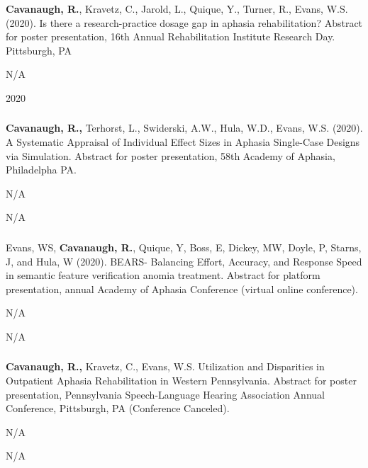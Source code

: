\documentclass[
]{article}
\begin{document}
\textbf{Cavanaugh, R.}, Kravetz, C., Jarold, L., Quique, Y., Turner, R.,
Evans, W.S. (2020). Is there a research-practice dosage gap in aphasia
rehabilitation? Abstract for poster presentation, 16th Annual
Rehabilitation Institute Research Day. Pittsburgh, PA

N/A

2020

\hypertarget{section-17}{%
\subsubsection{}\label{section-17}}

\textbf{Cavanaugh, R.,} Terhorst, L., Swiderski, A.W., Hula, W.D.,
Evans, W.S. (2020). A Systematic Appraisal of Individual Effect Sizes in
Aphasia Single-Case Designs via Simulation. Abstract for poster
presentation, 58th Academy of Aphasia, Philadelpha PA.

N/A

N/A

\hypertarget{section-18}{%
\subsubsection{}\label{section-18}}

Evans, WS, \textbf{Cavanaugh, R.}, Quique, Y, Boss, E, Dickey, MW,
Doyle, P, Starns, J, and Hula, W (2020). BEARS- Balancing Effort,
Accuracy, and Response Speed in semantic feature verification anomia
treatment. Abstract for platform presentation, annual Academy of Aphasia
Conference (virtual online conference).

N/A

N/A

\hypertarget{section-19}{%
\subsubsection{}\label{section-19}}

\textbf{Cavanaugh, R.,} Kravetz, C., Evans, W.S. Utilization and
Disparities in Outpatient Aphasia Rehabilitation in Western
Pennsylvania. Abstract for poster presentation, Pennsylvania
Speech-Language Hearing Association Annual Conference, Pittsburgh, PA
(Conference Canceled).

N/A

N/A

\hypertarget{section-20}{%
\subsubsection{}\label{section-20}}
\end{document}

